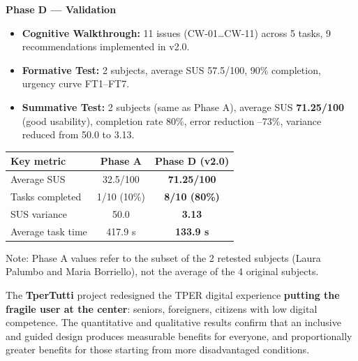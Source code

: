 ﻿\documentclass[11pt,a4paper]{article}
\begin{document}
\begin{tcolorbox}[sectionbox]
\vspace{0.2cm}

\noindent\textbf{Phase D --- Validation}
\begin{itemize}[leftmargin=*]
  \item \textbf{Cognitive Walkthrough:} 11 issues (CW-01\ldots{}CW-11) across 5 tasks, 9 recommendations implemented in v2.0.
  \item \textbf{Formative Test:} 2 subjects, average SUS 57.5/100, 90\% completion, urgency curve FT1--FT7.
  \item \textbf{Summative Test:} 2 subjects (same as Phase A), average SUS \textbf{71.25/100} (good usability), completion rate 80\%, error reduction --73\%, variance reduced from 50.0 to 3.13.
\end{itemize}

\vspace{0.2cm}

\begin{center}
\renewcommand{\arraystretch}{1.3}
\begin{tabular}{lcc}
\toprule
\textbf{Key metric} & \textbf{Phase A} & \textbf{Phase D (v2.0)} \\
\midrule
Average SUS & 32.5/100 & \textbf{71.25/100} \\
Tasks completed & 1/10 (10\%) & \textbf{8/10 (80\%)} \\
SUS variance & 50.0 & \textbf{3.13} \\
Average task time & 417.9 s & \textbf{133.9 s} \\
\bottomrule
\end{tabular}
\end{center}

\vspace{0.2cm}
\small Note: Phase A values refer to the subset of the 2 retested subjects (Laura Palumbo and Maria Borriello), not the average of the 4 original subjects.

\vspace{0.2cm}

\noindent The \textbf{TperTutti} project redesigned the TPER digital experience \textbf{putting the fragile user at the center}: seniors, foreigners, citizens with low digital competence. The quantitative and qualitative results confirm that an inclusive and guided design produces measurable benefits for everyone, and proportionally greater benefits for those starting from more disadvantaged conditions.

\end{tcolorbox}
\end{document}
